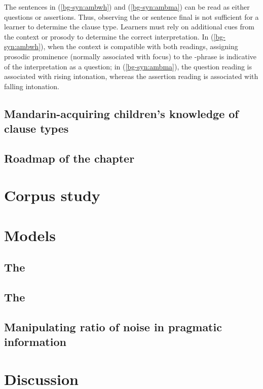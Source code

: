 \noindent 
The sentences in (\ref{bg-syn:ambwh}) and (\ref{bg-syn:ambma}) can be read as either questions or assertions. Thus, observing the \twh{}  or sentence final \ma{} is not sufficient for a learner to determine the clause type. Learners must rely on additional cues from the context or prosody to determine the correct interpretation. In (\ref{bg-syn:ambwh}), when the context is compatible with both readings, assigning prosodic prominence (normally associated with focus) to the \twh-phrase is indicative of the interpretation as a question; in (\ref{bg-syn:ambma}), the question reading is associated with rising intonation, whereas the assertion reading is associated with falling intonation. 



\subsection{Mandarin-acquiring children's knowledge of clause types}

\subsection{Roadmap of the chapter}

\section{Corpus study}

\section{Models}
\subsection{The \distlearner{}}
\subsection{The \praglearner{}}
\subsection{Manipulating ratio of noise in pragmatic information}

\section{Discussion}





